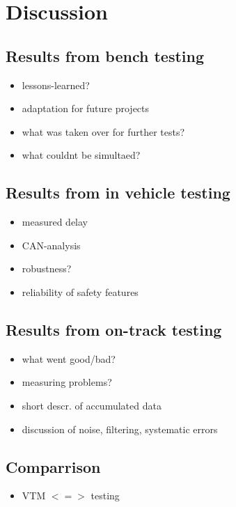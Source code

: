 \documentclass[ExampleMasters.tex]{subfiles}
\begin{document}
\clearpage
\chapter{Discussion}
\label{chap:discussion}

\section{Results from bench testing}
\label{sec:results_bench}

\begin{itemize}
	\item lessons-learned?
	\item adaptation for future projects
	\item what was taken over for further tests? 
	\item what couldnt be simultaed?
\end{itemize}

\section{Results from in vehicle testing}
\label{sec:results_vehicle_testing}

\begin{itemize}
	\item measured delay
	\item CAN-analysis
	\item robustness?
	\item reliability of safety features
\end{itemize}

\section{Results from on-track testing}
\label{sec:results_track}
\begin{itemize}
	\item what went good/bad?
	\item measuring problems?
	\item short descr. of accumulated data
	\item discussion of noise, filtering, systematic errors
\end{itemize}
\section{Comparrison}
\label{sec:results_comparrison}
\begin{itemize}
	\item VTM $<=>$ testing
\end{itemize}
\end{document}
